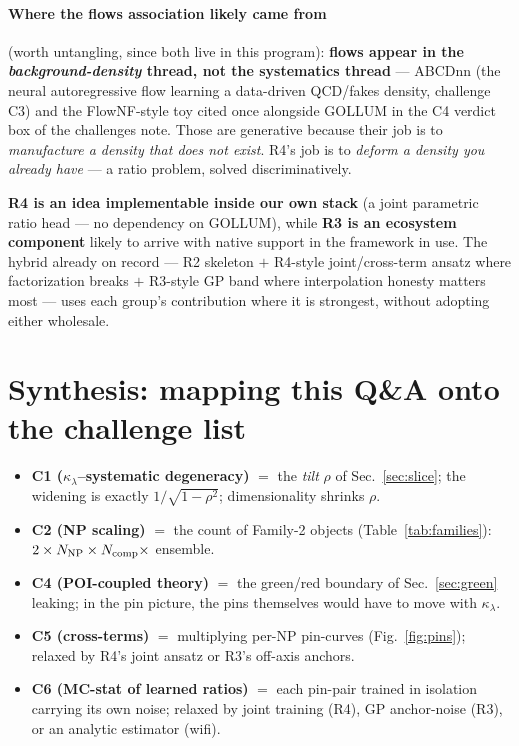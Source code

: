 \documentclass[11pt]{article}
\newcommand{\kl}{\ensuremath{\kappa_\lambda}}
\begin{document}
\paragraph{Where the flows association likely came from} (worth untangling, since both live in this program):
\textbf{flows appear in the \emph{background-density} thread, not the systematics thread} --- ABCDnn (the
neural autoregressive flow learning a data-driven QCD/fakes density, challenge C3) and the FlowNF-style toy
cited once alongside GOLLUM in the C4 verdict box of the challenges note. Those are generative because their
job is to \emph{manufacture a density that does not exist}. R4's job is to \emph{deform a density you already
have} --- a ratio problem, solved discriminatively.

\begin{takeaway}
\textbf{R4 is an idea implementable inside our own stack} (a joint parametric ratio head --- no dependency on
GOLLUM), while \textbf{R3 is an ecosystem component} likely to arrive with native support in the framework in
use. The hybrid already on record --- R2 skeleton $+$ R4-style joint/cross-term ansatz where factorization
breaks $+$ R3-style GP band where interpolation honesty matters most --- uses each group's contribution where
it is strongest, without adopting either wholesale.
\end{takeaway}

\section{Synthesis: mapping this Q\&A onto the challenge list}

\begin{keybox}
\begin{itemize}[leftmargin=1.2em]
\item \textbf{C1 (\kl--systematic degeneracy)} $=$ the \emph{tilt} $\rho$ of Sec.~\ref{sec:slice}; the widening
  is exactly $1/\sqrt{1-\rho^2}$; dimensionality shrinks $\rho$.
\item \textbf{C2 (NP scaling)} $=$ the count of Family-2 objects (Table~\ref{tab:families}):
  $2\times N_{\rm NP}\times N_{\rm comp}\times$ ensemble.
\item \textbf{C4 (POI-coupled theory)} $=$ the green/red boundary of Sec.~\ref{sec:green} leaking; in the
  pin picture, the pins themselves would have to move with \kl.
\item \textbf{C5 (cross-terms)} $=$ multiplying per-NP pin-curves (Fig.~\ref{fig:pins}); relaxed by R4's joint
  ansatz or R3's off-axis anchors.
\item \textbf{C6 (MC-stat of learned ratios)} $=$ each pin-pair trained in isolation carrying its own noise;
  relaxed by joint training (R4), GP anchor-noise (R3), or an analytic estimator (wifi).
\end{itemize}
\end{keybox}
\end{document}
